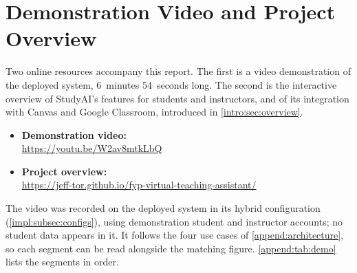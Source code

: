 \chapter{Demonstration Video and Project Overview}
\label{append:demo}
\vspace*{2em}

Two online resources accompany this report. The first is a video
demonstration of the deployed system, 6~minutes 54~seconds long. The second
is the interactive overview of StudyAI's features for students and
instructors, and of its integration with Canvas and Google Classroom,
introduced in \autoref{intro:sec:overview}.

\begin{itemize}
  \item \textbf{Demonstration video:}\\
        \url{https://youtu.be/W2av8mtkLbQ}
  \item \textbf{Project overview:}\\
        \url{https://jeff-tor.github.io/fyp-virtual-teaching-assistant/}
\end{itemize}

The video was recorded on the deployed system in its hybrid configuration
(\autoref{impl:subsec:configs}), using demonstration student and instructor
accounts; no student data appears in it. It follows the four use cases of
\autoref{append:architecture}, so each segment can be read alongside the
matching figure. \autoref{append:tab:demo} lists the segments in order.

